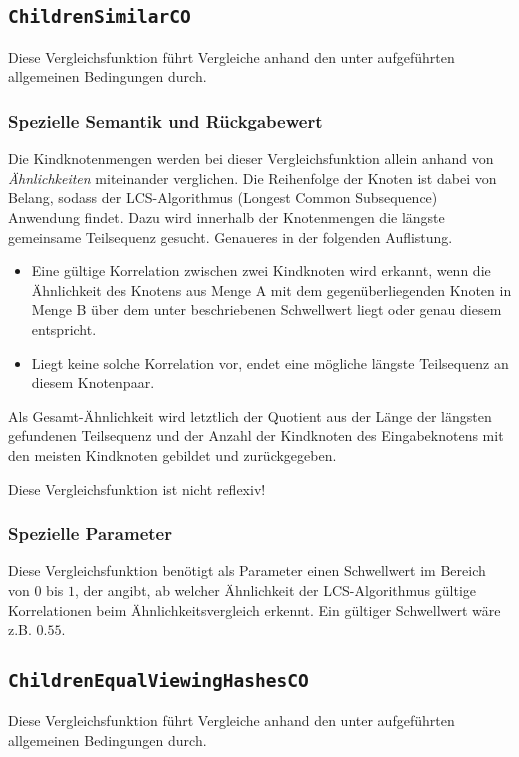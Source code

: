 \newpage
%
%
\subsection{\texttt{ChildrenSimilarCO}}
Diese Vergleichsfunktion führt Vergleiche anhand den unter  aufgeführten allgemeinen Bedingungen durch.

\subsubsection*{Spezielle Semantik und Rückgabewert}
Die Kindknotenmengen werden bei dieser Vergleichsfunktion allein anhand von \emph{Ähnlichkeiten} miteinander verglichen. Die Reihenfolge der Knoten ist dabei von Belang, sodass der LCS-Algorithmus (Longest Common Subsequence) Anwendung findet. Dazu wird innerhalb der Knotenmengen die längste gemeinsame Teilsequenz gesucht. Genaueres in der folgenden Auflistung.
\begin{itemize}
	\item Eine gültige Korrelation zwischen zwei Kindknoten wird erkannt, wenn die Ähnlichkeit des Knotens aus Menge A mit dem gegenüberliegenden Knoten in Menge B über dem unter  beschriebenen Schwellwert liegt oder genau diesem entspricht.
	\item Liegt keine solche Korrelation vor, endet eine mögliche längste Teilsequenz an diesem Knotenpaar.
\end{itemize}

Als Gesamt-Ähnlichkeit wird letztlich der Quotient aus der Länge der längsten gefundenen Teilsequenz und der Anzahl der Kindknoten des Eingabeknotens mit den meisten Kindknoten gebildet und zurückgegeben.

 Diese Vergleichsfunktion ist nicht reflexiv!

\subsubsection*{Spezielle Parameter}
Diese Vergleichsfunktion benötigt als Parameter einen Schwellwert im Bereich von $0$ bis $1$, der angibt, ab welcher Ähnlichkeit der LCS-Algorithmus gültige Korrelationen beim Ähnlichkeitsvergleich erkennt. Ein gültiger Schwellwert wäre z.B. $0.55$.


%
%
\subsection{\texttt{ChildrenEqualViewingHashesCO}}
Diese Vergleichsfunktion führt Vergleiche anhand den unter  aufgeführten allgemeinen Bedingungen durch.

